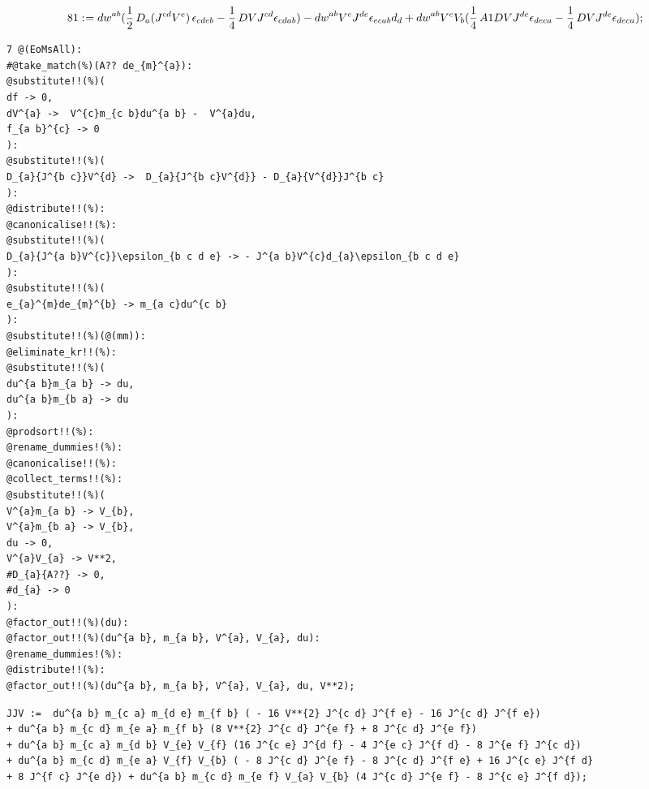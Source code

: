 \documentclass[11pt]{article}
\def\specialcolon{\mathrel{\mathop{:}}\hspace{-.5em}}
\begin{document}
\begin{dmath*}[compact, spread=2pt]
81\specialcolon{}= {dw}^{a b} (\frac{1}{2}\, {D}_{a}{({J}^{c d} {V}^{e})}\,  {\epsilon}_{c d e b} - \frac{1}{4}\, DV {J}^{c d} {\epsilon}_{c d a b}) - {dw}^{a b} {V}^{c} {J}^{d e} {\epsilon}_{e c a b} {d}_{d} + {dw}^{a b} {V}^{c} {V}_{b} (\frac{1}{4}\, A1 DV {J}^{d e} {\epsilon}_{d e c a} - \frac{1}{4}\, DV {J}^{d e} {\epsilon}_{d e c a});
\end{dmath*}
{\color[named]{Blue}\begin{verbatim}
7 @(EoMsAll):
#@take_match(%)(A?? de_{m}^{a}):
@substitute!!(%)(
df -> 0,
dV^{a} ->  V^{c}m_{c b}du^{a b} -  V^{a}du,
f_{a b}^{c} -> 0
):
@substitute!!(%)(
D_{a}{J^{b c}}V^{d} ->  D_{a}{J^{b c}V^{d}} - D_{a}{V^{d}}J^{b c}
):
@distribute!!(%):
@canonicalise!!(%):
@substitute!!(%)(
D_{a}{J^{a b}V^{c}}\epsilon_{b c d e} -> - J^{a b}V^{c}d_{a}\epsilon_{b c d e}
):
@substitute!!(%)(
e_{a}^{m}de_{m}^{b} -> m_{a c}du^{c b}
):
@substitute!!(%)(@(mm)):
@eliminate_kr!!(%):
@substitute!!(%)(
du^{a b}m_{a b} -> du,
du^{a b}m_{b a} -> du
):
@prodsort!!(%):
@rename_dummies!(%):
@canonicalise!!(%):
@collect_terms!!(%):
@substitute!!(%)(
V^{a}m_{a b} -> V_{b},
V^{a}m_{b a} -> V_{b},
du -> 0,
V^{a}V_{a} -> V**2,
#D_{a}{A??} -> 0,
#d_{a} -> 0
):
@factor_out!!(%)(du):
@factor_out!!(%)(du^{a b}, m_{a b}, V^{a}, V_{a}, du):
@rename_dummies!(%):
@distribute!!(%):
@factor_out!!(%)(du^{a b}, m_{a b}, V^{a}, V_{a}, du, V**2);
\end{verbatim}}
{\color[named]{Blue}\begin{verbatim}
JJV :=  du^{a b} m_{c a} m_{d e} m_{f b} ( - 16 V**{2} J^{c d} J^{f e} - 16 J^{c d} J^{f e}) 
+ du^{a b} m_{c d} m_{e a} m_{f b} (8 V**{2} J^{c d} J^{e f} + 8 J^{c d} J^{e f}) 
+ du^{a b} m_{c a} m_{d b} V_{e} V_{f} (16 J^{c e} J^{d f} - 4 J^{e c} J^{f d} - 8 J^{e f} J^{c d}) 
+ du^{a b} m_{c d} m_{e a} V_{f} V_{b} ( - 8 J^{c d} J^{e f} - 8 J^{c d} J^{f e} + 16 J^{c e} J^{f d} 
+ 8 J^{f c} J^{e d}) + du^{a b} m_{c d} m_{e f} V_{a} V_{b} (4 J^{c d} J^{e f} - 8 J^{c e} J^{f d});
\end{verbatim}}
\end{document}
